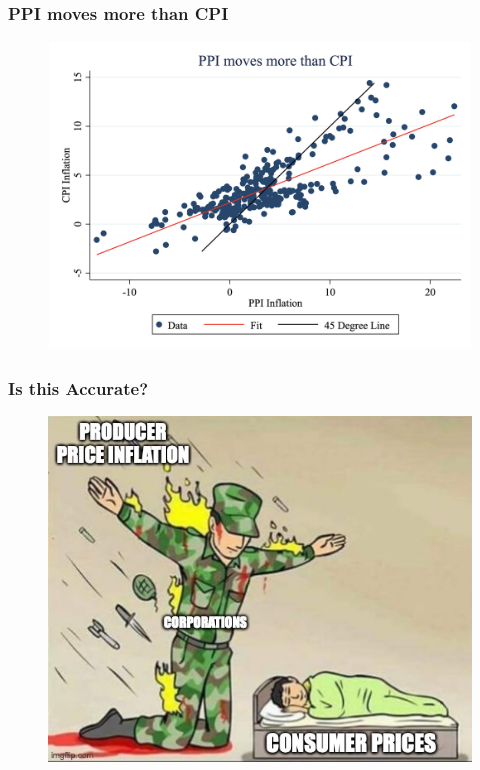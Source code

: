\documentclass{beamer}
\begin{document}
\begin{frame}
\frametitle[alignment=center]{PPI moves more than CPI}
\begin{figure}
\includegraphics[scale=0.18]{Figures/Fig_CPIvPPI.png}
\end{figure}
\end{frame}


\begin{frame}
\frametitle[alignment=center]{Is this Accurate?}
\begin{figure}
\includegraphics[scale=0.4]{Figures/PPI_Meme.jpeg}
\end{figure}
\end{frame}
\end{document}
